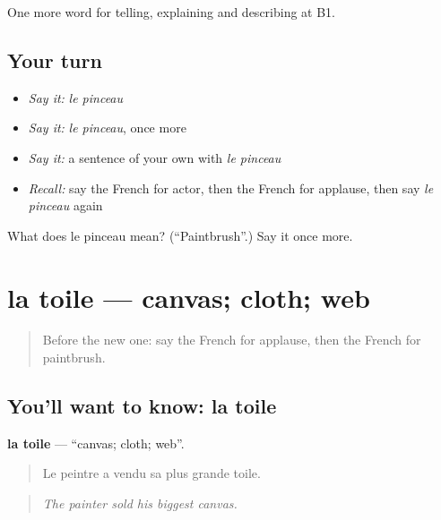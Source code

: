 \begin{grammarlens}[title={What you've built}]
One more word for telling, explaining and describing at B1.
\end{grammarlens}

\subsection*{Your turn}
\begin{itemize}
\raggedright
  \item \emph{Say it:} \emph{le pinceau}
  \item \emph{Say it:} \emph{le pinceau}, once more
  \item \emph{Say it:} a sentence of your own with \emph{le pinceau}
  \item \emph{Recall:} say the French for actor, then the French for applause, then say \emph{le pinceau} again
\end{itemize}

\begin{tcolorbox}[breakable,colback=teal!4,colframe=teal!35!black,title={Before you move on}]
What does le pinceau mean? (\textquotedblleft{}Paintbrush\textquotedblright{}.) Say it once more.
\end{tcolorbox}
\section[la toile]{la toile — canvas; cloth; web}

\label{lesson:FR-C516-toile}



\begin{quote}
Before the new one: say the French for applause, then the French for paintbrush.
\end{quote}

\subsection*{You'll want to know: la toile}
\textbf{la toile} — \textquotedblleft{}canvas; cloth; web\textquotedblright{}.

\begin{quote}
Le peintre a vendu sa plus grande toile.
\end{quote}

\begin{quote}
\emph{The painter sold his biggest canvas.}
\end{quote}

